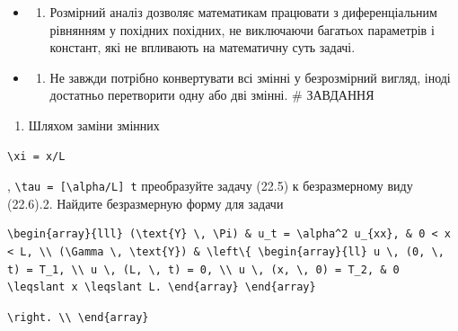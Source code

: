 \documentclass[
  ukrainian,
]{article}
\providecommand{\tightlist}{%
  \setlength{\itemsep}{0pt}\setlength{\parskip}{0pt}}
\begin{document}
\begin{itemize}
\tightlist
\item
  \begin{enumerate}
  \def\labelenumi{\arabic{enumi}.}
  \setcounter{enumi}{1}
  \tightlist
  \item
    Розмірний аналіз дозволяє математикам працювати з диференціальним
    рівнянням у похідних похідних, не виключаючи багатьох параметрів і
    констант, які не впливають на математичну суть задачі.
  \end{enumerate}
\item
  \begin{enumerate}
  \def\labelenumi{\arabic{enumi}.}
  \setcounter{enumi}{2}
  \tightlist
  \item
    Не завжди потрібно конвертувати всі змінні у безрозмірний вигляд,
    іноді достатньо перетворити одну або дві змінні. \# ЗАВДАННЯ
  \end{enumerate}
\end{itemize}

\begin{enumerate}
\def\labelenumi{\arabic{enumi}.}
\tightlist
\item
  Шляхом заміни змінних
\end{enumerate}

\begin{verbatim}
\xi = x/L
\end{verbatim}

, \texttt{\textbackslash{}tau\ =\ {[}\textbackslash{}alpha/L{]}\ t}
преобразуйте задачу (22.5) к безразмерному виду (22.6).2. Найдите
безразмерную форму для задачи

\begin{verbatim}
\begin{array}{lll} (\text{Y} \, \Pi) & u_t = \alpha^2 u_{xx}, & 0 < x < L, \\ (\Gamma \, \text{Y}) & \left\{ \begin{array}{ll} u \, (0, \, t) = T_1, \\ u \, (L, \, t) = 0, \\ u \, (x, \, 0) = T_2, & 0 \leqslant x \leqslant L. \end{array} \end{array}
\end{verbatim}

\begin{verbatim}
\right. \\ \end{array}
\end{verbatim}
\end{document}

